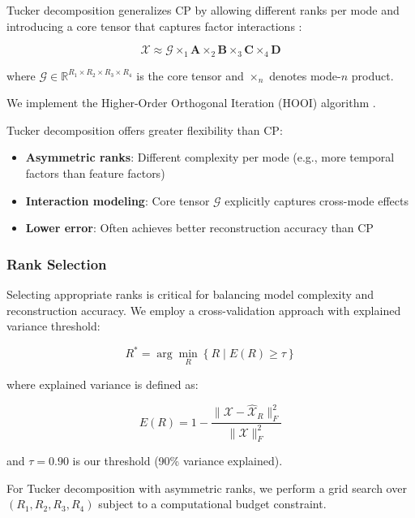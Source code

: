 \documentclass[11pt,twocolumn]{article}
\begin{document}
Tucker decomposition generalizes CP by allowing different ranks per mode and introducing a core tensor that captures factor interactions \citep{Tucker1966Some}:

\begin{equation}
\mathcal{X} \approx \mathcal{G} \times_1 \mathbf{A} \times_2 \mathbf{B} \times_3 \mathbf{C} \times_4 \mathbf{D}
\label{eq:tucker}
\end{equation}

where $\mathcal{G} \in \mathbb{R}^{R_1 \times R_2 \times R_3 \times R_4}$ is the core tensor and $\times_n$ denotes mode-$n$ product.

We implement the Higher-Order Orthogonal Iteration (HOOI) algorithm \citep{DeLathauwer2000Multilinear}.

Tucker decomposition offers greater flexibility than CP:

\begin{itemize}[leftmargin=*]
    \item \textbf{Asymmetric ranks}: Different complexity per mode (e.g., more temporal factors than feature factors)
    \item \textbf{Interaction modeling}: Core tensor $\mathcal{G}$ explicitly captures cross-mode effects
    \item \textbf{Lower error}: Often achieves better reconstruction accuracy than CP
\end{itemize}

\subsubsection{Rank Selection}

Selecting appropriate ranks is critical for balancing model complexity and reconstruction accuracy. We employ a cross-validation approach with explained variance threshold:

\begin{equation}
R^* = \arg\min_{R} \left\{ R \mid E(R) \geq \tau \right\}
\label{eq:rank-selection}
\end{equation}

where explained variance is defined as:

$$E(R) = 1 - \frac{\|\mathcal{X} - \hat{\mathcal{X}}_R\|_F^2}{\|\mathcal{X}\|_F^2}$$

and $\tau = 0.90$ is our threshold (90\% variance explained).

For Tucker decomposition with asymmetric ranks, we perform a grid search over $(R_1, R_2, R_3, R_4)$ subject to a computational budget constraint.
\end{document}
